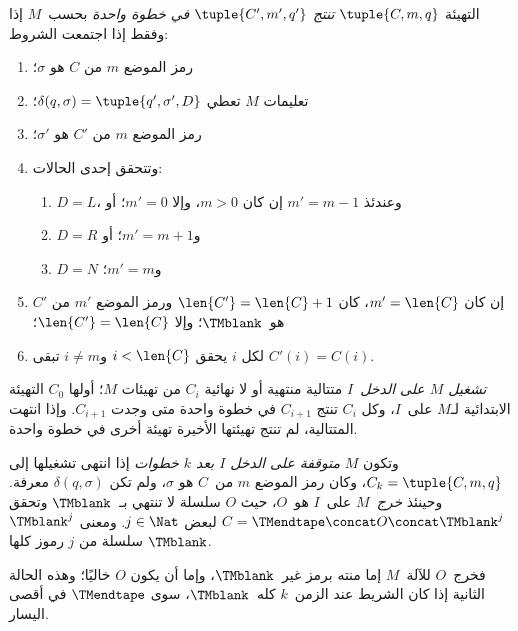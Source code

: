 \documentclass[../../../include/open-logic-section]{subfiles}
\begin{document}
\begin{defn}
التهيئة $\tuple{C,m,q}$ \emph{تنتج $\tuple{C',m',q'}$ في خطوة واحدة} بحسب~$M$ إذا وفقط إذا اجتمعت الشروط:
\begin{enumerate}
\item رمز الموضع $m$ من $C$ هو $\sigma$؛
\item تعليمات $M$ تعطي $\delta(q,\sigma)=
  \tuple{q',\sigma',D}$؛
\item رمز الموضع $m$ من $C'$ هو $\sigma'$؛
\item وتتحقق إحدى الحالات:
\begin{enumerate}
\item $D=L$، وعندئذ $m'=m-1$ إن كان $m>0$، وإلا $m'=0$؛ أو
\item $D=R$ و$m'=m+1$؛ أو
\item $D=N$ و$m'=m$؛
\end{enumerate}
\item إن كان $m'=\len{C}$، كان $\len{C'}=\len{C}+1$ ورمز الموضع $m'$ من $C'$ هو~$\TMblank$؛ وإلا $\len{C'}=\len{C}$؛
\item لكل $i$ يحقق $i<\len{C}$ و$i\neq m$ تبقى $C'(i)=C(i)$.
\end{enumerate}
\end{defn}

\begin{defn}
\emph{تشغيل $M$ على الدخل~$I$} متتالية منتهية أو لا نهائية $C_i$ من تهيئات $M$؛ أولها $C_0$ التهيئة الابتدائية لـ$M$ على~$I$، وكل $C_i$ تنتج $C_{i+1}$ في خطوة واحدة متى وجدت $C_{i+1}$. وإذا انتهت المتتالية، لم تنتج تهيئتها الأخيرة تهيئة أخرى في خطوة واحدة.

وتكون $M$ \emph{متوقفة على الدخل $I$ بعد $k$ خطوات} إذا انتهى تشغيلها إلى $C_k=\tuple{C,m,q}$، وكان رمز الموضع $m$ من~$C$ هو $\sigma$، ولم تكن $\delta(q,\sigma)$ معرفة. وحينئذ \emph{خرج}~$M$ على~$I$ هو~$O$، حيث $O$ سلسلة لا تنتهي بـ~$\TMblank$ وتحقق $C=\TMendtape\concat O\concat\TMblank^j$ لبعض $j \in \Nat$. ومعنى $\TMblank^j$ سلسلة من $j$ رموز كلها $\TMblank$.
\end{defn}

\begin{explain}
فخرج~$O$ للآلة~$M$ إما منته برمز غير~$\TMblank$، وإما أن يكون $O$ خاليًا؛ وهذه الحالة الثانية إذا كان الشريط عند الزمن~$k$ كله~$\TMblank$، سوى $\TMendtape$ في أقصى اليسار.
\end{explain}
\end{document}
